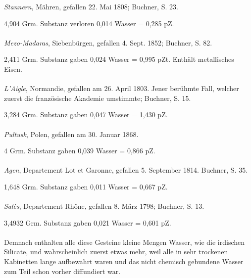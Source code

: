 \documentclass[a4paper, 11pt, oneside, german]{article}
\begin{document}
\emph{Stannern}, Mähren, gefallen 22. Mai 1808; Buchner, S. 23.
\begin{center}
\small
4,904 Grm. Substanz verloren 0,014 Wasser = 0,285 pZ.
\end{center}
\paragraph{}
\emph{Mezo-Madaras}, Siebenbürgen, gefallen 4. Sept. 1852; Buchner, S. 82.
\begin{center}
\small
2,411 Grm. Substanz gaben 0,024 Wasser = 0,995 pZt. Enthält metallisches Eisen.
\end{center}
\paragraph{}
\emph{L'Aigle}, Normandie, gefallen am 26. April 1803. Jener berühmte Fall, welcher zuerst die französische Akademie umstimmte; Buchner, S. 15.
\begin{center}
\small
3,284 Grm. Substanz gaben 0,047 Wasser = 1,430 pZ.
\end{center}
\paragraph{}
\emph{Pultusk}, Polen, gefallen am 30. Januar 1868.
\begin{center}
\small
4 Grm. Substanz gaben 0,039 Wasser = 0,866 pZ.
\end{center}
\paragraph{}
\emph{Agen}, Departement Lot et Garonne, gefallen 5. September 1814. Buchner, S. 35.
\begin{center}
\small
1,648 Grm. Substanz gaben 0,011 Wasser = 0,667 pZ.
\end{center}
\paragraph{}
\emph{Salès}, Departement Rhône, gefallen 8. März 1798; Buchner, S. 13.
\begin{center}
\small
3,4932 Grm. Substanz gaben 0,021 Wasser = 0,601 pZ.
\end{center}
\paragraph{}
Demnach enthalten alle diese Gesteine kleine Mengen Wasser, wie die irdischen Silicate, und wahrscheinlich zuerst etwas mehr, weil alle in sehr trockenen Kabinetten lange aufbewahrt waren und das nicht chemisch gebundene Wasser zum Teil schon vorher diffundiert war.
\end{document}
